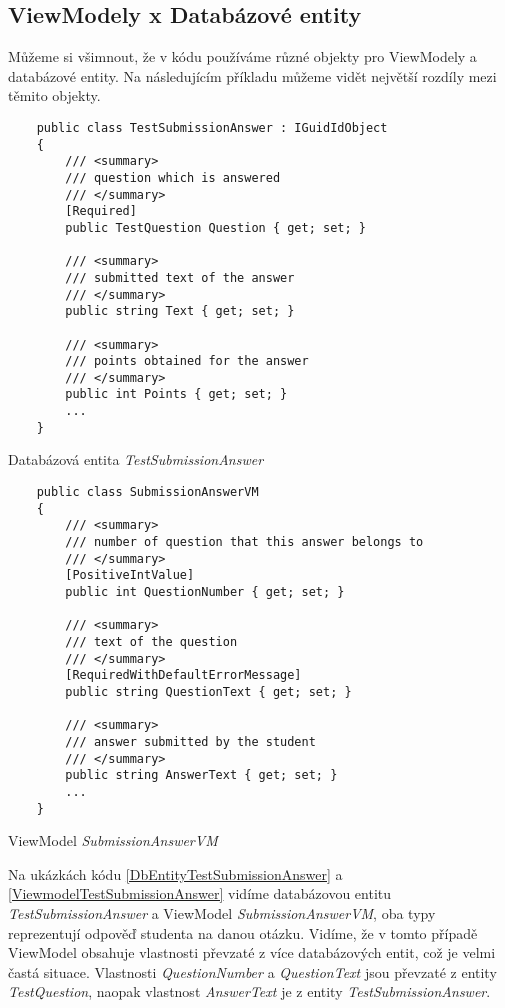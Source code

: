 \subsection{ViewModely x Databázové entity}

Můžeme si všimnout, že v kódu používáme různé objekty pro ViewModely a databázové entity. 
Na následujícím příkladu můžeme vidět největší rozdíly mezi těmito objekty.

\lstset{style=sharpc}

\begin{program}
	\begin{lstlisting}
	public class TestSubmissionAnswer : IGuidIdObject
	{	
		/// <summary>
		/// question which is answered
		/// </summary>
		[Required]
		public TestQuestion Question { get; set; }
		
		/// <summary>
		/// submitted text of the answer
		/// </summary>
		public string Text { get; set; }
		
		/// <summary>
		/// points obtained for the answer
		/// </summary>
		public int Points { get; set; }
		...
	}
	\end{lstlisting}
	\caption{Databázová entita \textit{TestSubmissionAnswer}}
	\label{DbEntityTestSubmissionAnswer}
\end{program}

\begin{program}
	\begin{lstlisting}
	public class SubmissionAnswerVM
	{	
		/// <summary>
		/// number of question that this answer belongs to
		/// </summary>
		[PositiveIntValue]
		public int QuestionNumber { get; set; }
		
		/// <summary>
		/// text of the question
		/// </summary>
		[RequiredWithDefaultErrorMessage]
		public string QuestionText { get; set; }
		
		/// <summary>
		/// answer submitted by the student
		/// </summary>
		public string AnswerText { get; set; }
		...
	}
	\end{lstlisting}
	\caption{ViewModel \textit{SubmissionAnswerVM}}
	\label{ViewmodelTestSubmissionAnswer}
\end{program}

Na ukázkách kódu \ref{DbEntityTestSubmissionAnswer} a \ref{ViewmodelTestSubmissionAnswer} vidíme databázovou entitu \textit{TestSubmissionAnswer} a ViewModel \textit{SubmissionAnswerVM}, oba typy reprezentují odpověď studenta na danou otázku.
Vidíme, že v tomto případě ViewModel obsahuje vlastnosti převzaté z více databázových entit, což je velmi častá situace. Vlastnosti \textit{QuestionNumber} a \textit{QuestionText} jsou převzaté z entity \textit{TestQuestion}, naopak vlastnost \textit{AnswerText} je z entity \textit{TestSubmissionAnswer}.

